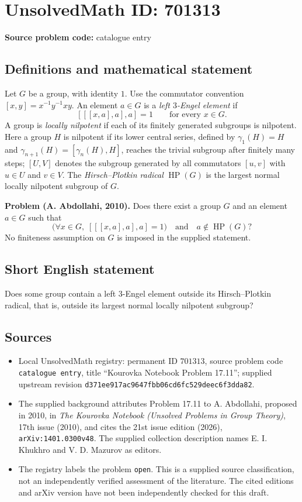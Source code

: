 \documentclass[11pt]{article}
\begin{document}
\section*{UnsolvedMath ID: 701313}
\textbf{Source problem code:} catalogue entry
\subsection{Definitions and mathematical statement}
Let \(G\) be a group, with identity \(1\). Use the commutator convention \([x,y]=x^{-1}y^{-1}xy\). An element \(a\in G\) is a \emph{left \(3\)-Engel element} if
\[
[[[x,a],a],a]=1\qquad\text{for every }x\in G.
\]
A group is \emph{locally nilpotent} if each of its finitely generated subgroups is nilpotent. Here a group \(H\) is nilpotent if its lower central series, defined by \(\gamma_1(H)=H\) and \(\gamma_{n+1}(H)=[\gamma_n(H),H]\), reaches the trivial subgroup after finitely many steps; \([U,V]\) denotes the subgroup generated by all commutators \([u,v]\) with \(u\in U\) and \(v\in V\). The \emph{Hirsch--Plotkin radical} \(\operatorname{HP}(G)\) is the largest normal locally nilpotent subgroup of \(G\).

\textbf{Problem (A. Abdollahi, 2010).} Does there exist a group \(G\) and an element \(a\in G\) such that
\[
\bigl(\forall x\in G,\; [[[x,a],a],a]=1\bigr)
\quad\text{and}\quad
a\notin\operatorname{HP}(G)?
\]
No finiteness assumption on \(G\) is imposed in the supplied statement.
\subsection{Short English statement}
Does some group contain a left \(3\)-Engel element outside its Hirsch--Plotkin radical, that is, outside its largest normal locally nilpotent subgroup?
\subsection{Sources}
\begin{itemize}
\item Local UnsolvedMath registry: permanent ID \(701313\), source problem code \texttt{catalogue entry}, title ``Kourovka Notebook Problem 17.11''; supplied upstream revision \texttt{d371ee917ac9647fbb06cd6fc529deec6f3dda82}.
\item The supplied background attributes Problem 17.11 to A. Abdollahi, proposed in 2010, in \emph{The Kourovka Notebook (Unsolved Problems in Group Theory)}, 17th issue (2010), and cites the 21st issue edition (2026), \texttt{arXiv:1401.0300v48}. The supplied collection description names E. I. Khukhro and V. D. Mazurov as editors.
\item The registry labels the problem \texttt{open}. This is a supplied source classification, not an independently verified assessment of the literature. The cited editions and arXiv version have not been independently checked for this draft.
\end{itemize}
\end{document}

